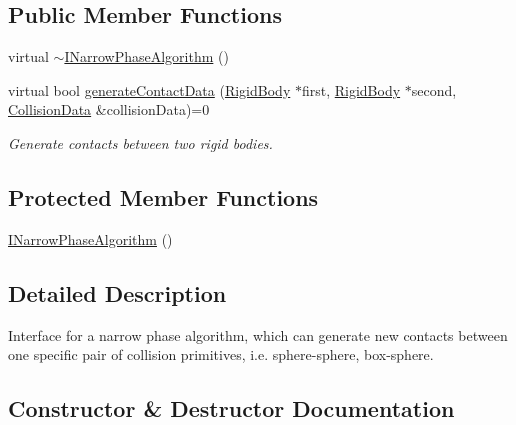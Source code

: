 \subsection*{Public Member Functions}
\begin{DoxyCompactItemize}
\item 
virtual \mbox{\hyperlink{classr3_1_1_i_narrow_phase_algorithm_a5c60462a72d97075b147bc4f0392b4f8}{$\sim$\+I\+Narrow\+Phase\+Algorithm}} ()
\item 
virtual bool \mbox{\hyperlink{classr3_1_1_i_narrow_phase_algorithm_a606fe8de5fe81ff45fedb81ca74717c3}{generate\+Contact\+Data}} (\mbox{\hyperlink{classr3_1_1_rigid_body}{Rigid\+Body}} $\ast$first, \mbox{\hyperlink{classr3_1_1_rigid_body}{Rigid\+Body}} $\ast$second, \mbox{\hyperlink{classr3_1_1_collision_data}{Collision\+Data}} \&collision\+Data)=0
\begin{DoxyCompactList}\small\item\em Generate contacts between two rigid bodies. \end{DoxyCompactList}\end{DoxyCompactItemize}
\subsection*{Protected Member Functions}
\begin{DoxyCompactItemize}
\item 
\mbox{\hyperlink{classr3_1_1_i_narrow_phase_algorithm_a870b838f5095825c1033a195f1e5d7e0}{I\+Narrow\+Phase\+Algorithm}} ()
\end{DoxyCompactItemize}


\subsection{Detailed Description}
Interface for a narrow phase algorithm, which can generate new contacts between one specific pair of collision primitives, i.\+e. sphere-\/sphere, box-\/sphere. 

\subsection{Constructor \& Destructor Documentation}
\mbox{\label{classr3_1_1_i_narrow_phase_algorithm_a5c60462a72d97075b147bc4f0392b4f8}} 
